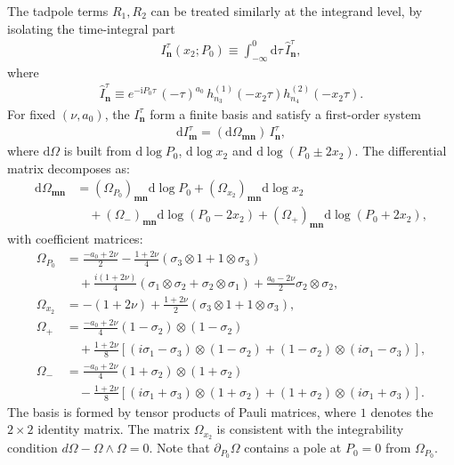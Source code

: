 \documentclass[a4paper]{article}
\newcommand{\n}{\nonumber}
\def\di{{\mathrm{d}}}
\def\ii{\mathrm{i}}
\begin{document}
The tadpole terms $R_1,R_2$ can be treated similarly at the integrand level, by isolating the time-integral part
\begin{align}
	I^{\tau}_{\bm n}(x_2;P_0)\equiv \int_{-\infty}^0 \di\tau\,\hat{I}^{\tau}_{\bm n},
\end{align}
where
\begin{align}
	\hat{I}^{\tau}_{\bm n} \equiv e^{-\ii P_0\tau}\,(-\tau)^{a_0}\,h_{n_3}^{(1)}(-x_2\tau)h_{n_4}^{(2)}(-x_2\tau).
\end{align}
For fixed $(\nu,a_0)$, the $I^{\tau}_{\bm n}$ form a finite basis and satisfy a first-order system
\begin{align}
	\di I^{\tau}_{\bm m}=\left(\di\Omega_{\bm m\bm n}\right)\,I^{\tau}_{\bm n},
\end{align}
where $\di\Omega$ is built from $\di\log P_0$, $\di\log x_2$ and $\di\log(P_0\pm 2x_2)$.
The differential matrix decomposes as:
\begin{align}
	\di\Omega_{\bm m\bm n} &= \left(\Omega_{P_0}\right)_{\bm m\bm n} \di\log P_0 + \left(\Omega_{x_2}\right)_{\bm m\bm n} \di\log x_2 \nonumber\\
    &\quad+ \left(\Omega_{-}\right)_{\bm m\bm n} \di\log(P_0-2x_2) + \left(\Omega_{+}\right)_{\bm m\bm n} \di\log(P_0+2x_2),
\end{align}
with coefficient matrices:
\begin{align}
	\Omega_{P_0} &= \frac{-a_0+2\nu}{2} 
	- \frac{1+2\nu}{4} (\sigma_3 \otimes 1 + 1 \otimes \sigma_3) \n\\
	&\quad + \frac{i(1+2\nu)}{4} (\sigma_1 \otimes \sigma_2 + \sigma_2 \otimes \sigma_1)
	+ \frac{a_0-2\nu}{2} \sigma_2 \otimes \sigma_2, \\
	\Omega_{x_2} &= -(1+2\nu) + \frac{1+2\nu}{2}(\sigma_3\otimes 1 + 1\otimes \sigma_3), \\
	\Omega_{+} &= \frac{-a_0+2\nu}{4}(1-\sigma_2)\otimes(1-\sigma_2) \n\\
	&\quad + \frac{1+2\nu}{8}\left[ (i\sigma_1-\sigma_3)\otimes(1-\sigma_2) + (1-\sigma_2)\otimes(i\sigma_1-\sigma_3) \right], \\
	\Omega_{-} &= \frac{-a_0+2\nu}{4}(1+\sigma_2)\otimes(1+\sigma_2) \n\\
	&\quad - \frac{1+2\nu}{8}\left[ (i\sigma_1+\sigma_3)\otimes(1+\sigma_2) + (1+\sigma_2)\otimes(i\sigma_1+\sigma_3) \right].
\end{align}
The basis is formed by tensor products of Pauli matrices, where $1$ denotes the $2\times 2$ identity matrix.
The matrix $\Omega_{x_2}$ is consistent with the integrability condition $d\Omega - \Omega \wedge \Omega = 0$.
Note that $\partial_{P_0}\Omega$ contains a pole at $P_0=0$ from $\Omega_{P_0}$. 
\end{document}
